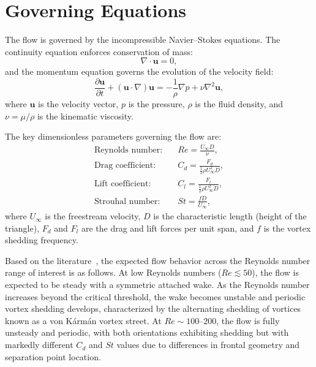 \section{Governing Equations}

The flow is governed by the incompressible Navier--Stokes equations.
The continuity equation enforces conservation of mass:
\begin{equation}
    \nabla \cdot \mathbf{u} = 0,
\end{equation}
and the momentum equation governs the evolution of the velocity field:
\begin{equation}
    \frac{\partial \mathbf{u}}{\partial t}
    + \left(\mathbf{u} \cdot \nabla\right)\mathbf{u}
    = -\frac{1}{\rho}\nabla p + \nu \nabla^2 \mathbf{u},
\end{equation}
where $\mathbf{u}$ is the velocity vector, $p$ is the pressure, $\rho$ is the fluid density, and $\nu = \mu/\rho$ is the kinematic viscosity.

The key dimensionless parameters governing the flow are:
\begin{align}
    \text{Reynolds number:}  \quad & Re  = \frac{U_\infty D}{\nu},                          \\[6pt]
    \text{Drag coefficient:} \quad & C_d = \frac{F_d}{\frac{1}{2}\rho U_\infty^2 D},        \\[6pt]
    \text{Lift coefficient:} \quad & C_l = \frac{F_l}{\frac{1}{2}\rho U_\infty^2 D},        \\[6pt]
    \text{Strouhal number:}  \quad & St  = \frac{f D}{U_\infty},
\end{align}
where $U_\infty$ is the freestream velocity, $D$ is the characteristic length (height of the triangle), $F_d$ and $F_l$ are the drag and lift forces per unit span, and $f$ is the vortex shedding frequency.

Based on the literature~\cite{kumardalal2006}, the expected flow behavior across the Reynolds number range of interest is as follows.
At low Reynolds numbers ($Re \lesssim 50$), the flow is expected to be steady with a symmetric attached wake. As the Reynolds number increases beyond the critical threshold, the wake becomes unstable and periodic vortex shedding develops, characterized by the alternating shedding of vortices known as a von K\'{a}rm\'{a}n
vortex street. At $Re \sim 100$--$200$, the flow is fully unsteady and periodic, with both orientations exhibiting shedding but with markedly different $C_d$ and $St$ values due to differences in frontal geometry and separation point location.
